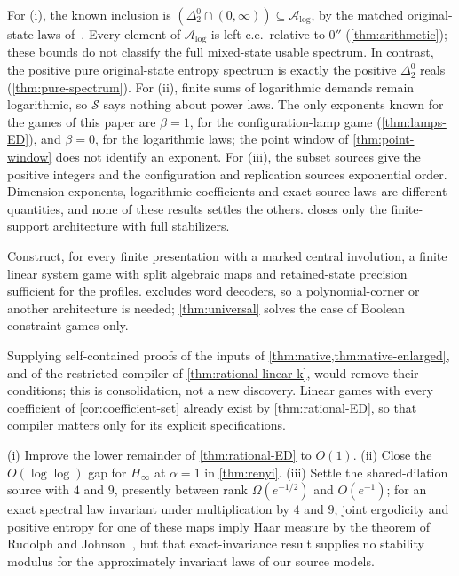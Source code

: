 For (i), the known inclusion is $(\Delta^0_2\cap(0,\infty))\subseteq\mathcal A_{\log}$, by the matched original-state laws of~\cite[Theorem~16.6 and Corollary~16.7]{DM-U3}. Every element of $\mathcal A_{\log}$ is left-c.e.\ relative to $0''$ (\cref{thm:arithmetic}); these bounds do not classify the full mixed-state usable spectrum. In contrast, the positive pure original-state entropy spectrum is exactly the positive $\Delta^0_2$ reals (\cref{thm:pure-spectrum}). For (ii), finite sums of
logarithmic demands remain logarithmic, so $\mathcal S$ says nothing about power laws. The only exponents known for the games of this paper
are $\beta=1$, for the configuration-lamp game (\cref{thm:lamps-ED}), and $\beta=0$, for the logarithmic laws; the point window of
\cref{thm:point-window} does not identify an exponent. For
(iii), the subset sources give the positive integers and the configuration and replication sources exponential order. Dimension
exponents, logarithmic coefficients and exact-source laws are different quantities, and none of these results settles the others.
 closes only the finite-support architecture with full stabilizers.

\begin{problem}\label{prob:linear}
Construct, for every finite presentation with a marked central involution, a finite linear system game with split algebraic maps
and retained-state precision sufficient for the profiles.  excludes word decoders, so a polynomial-corner or
another architecture is needed; \cref{thm:universal} solves the case of Boolean constraint games only.
\end{problem}

Supplying self-contained proofs of the inputs of \cref{thm:native,thm:native-enlarged}, and of the restricted compiler of
\cref{thm:rational-linear-k}, would remove their conditions; this is consolidation, not a new discovery. Linear games with every
coefficient of \cref{cor:coefficient-set} already exist by \cref{thm:rational-ED}, so that compiler matters only for its explicit
specifications.

\begin{problem}\label{prob:analytic}
(i) Improve the lower remainder of \cref{thm:rational-ED} to $O(1)$. (ii) Close the $O(\log\log)$ gap for $H_\infty$ at $\alpha=1$ in
\cref{thm:renyi}. (iii) Settle the shared-dilation source with $4$ and $9$, presently between rank $\Omega(e^{-1/2})$ and $O(e^{-1})$;
for an exact spectral law invariant under multiplication by $4$ and $9$, joint ergodicity and positive entropy for one of these
maps imply Haar measure by the theorem of Rudolph and Johnson~\cite{Rud90,Joh92}, but that exact-invariance result supplies no
stability modulus for the approximately invariant laws of our source models.
\end{problem}

